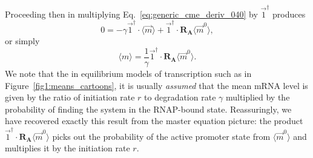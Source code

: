 Proceeding then in multiplying Eq.~\ref{eq:generic_cme_deriv_040} by
$\vec{1}^\dagger$ produces
\begin{equation}
0 = -\gamma \vec{1}^\dagger\cdot\langle\vec{m}\rangle
+ \vec{1}^\dagger\cdot\mathbf{R_A}\langle\vec{m}^0\rangle,
\end{equation}
or simply
\begin{equation}
\langle{m}\rangle
= \frac{1}{\gamma} \vec{1}^\dagger\cdot\mathbf{R_A}\langle\vec{m}^0\rangle.
\label{eq:generic_mean_m_appdx}
\end{equation}
We note that the in equilibrium models of transcription such as in
Figure~\ref{fig1:means_cartoons}, it is usually \textit{assumed} that the mean
mRNA level is given by the ratio of initiation rate $r$ to degradation rate
$\gamma$ multiplied by the probability of finding the system in the RNAP-bound
state. Reassuringly, we have recovered exactly this result from the master
equation picture: the product
$\vec{1}^\dagger\cdot\mathbf{R_A}\langle\vec{m}^0\rangle$ picks out the
probability of the active promoter state from $\langle\vec{m}^0\rangle$ and
multiplies it by the initiation rate $r$.

